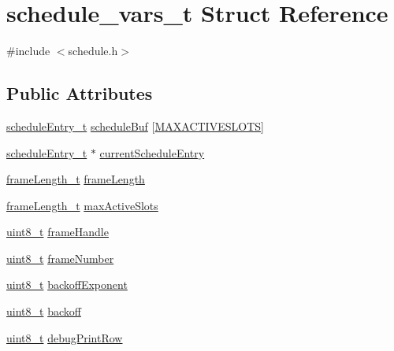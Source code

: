 \hypertarget{structschedule__vars__t}{}\section{schedule\+\_\+vars\+\_\+t Struct Reference}
\label{structschedule__vars__t}


{\ttfamily \#include $<$schedule.\+h$>$}

\subsection*{Public Attributes}
\begin{DoxyCompactItemize}
\item 
\hyperlink{structschedule_entry__t}{schedule\+Entry\+\_\+t} \hyperlink{structschedule__vars__t_a05b00ed294afeac2f3e2525231039a5c}{schedule\+Buf} \mbox{[}\hyperlink{group___schedule_ga5b6f09fe180237288683a64602eb5a85}{M\+A\+X\+A\+C\+T\+I\+V\+E\+S\+L\+O\+TS}\mbox{]}
\item 
\hyperlink{structschedule_entry__t}{schedule\+Entry\+\_\+t} $\ast$ \hyperlink{structschedule__vars__t_a8a63d21af04805a20c4361f58b809d51}{current\+Schedule\+Entry}
\item 
\hyperlink{group___schedule_gab960413860c0b01b38ece025b0ee534d}{frame\+Length\+\_\+t} \hyperlink{structschedule__vars__t_a6414f530ffa703355f89868cc4bcc711}{frame\+Length}
\item 
\hyperlink{group___schedule_gab960413860c0b01b38ece025b0ee534d}{frame\+Length\+\_\+t} \hyperlink{structschedule__vars__t_ab93c6951abd5fd6fecabe15b5faf7644}{max\+Active\+Slots}
\item 
\hyperlink{_p_e___types_8h_aba7bc1797add20fe3efdf37ced1182c5}{uint8\+\_\+t} \hyperlink{structschedule__vars__t_a2d897e0a8ee6c61193f2567ad80116a9}{frame\+Handle}
\item 
\hyperlink{_p_e___types_8h_aba7bc1797add20fe3efdf37ced1182c5}{uint8\+\_\+t} \hyperlink{structschedule__vars__t_a411d136c167ac38a1b275a04f635f346}{frame\+Number}
\item 
\hyperlink{_p_e___types_8h_aba7bc1797add20fe3efdf37ced1182c5}{uint8\+\_\+t} \hyperlink{structschedule__vars__t_aaef939536fcb09d07535d0209a512fad}{backoff\+Exponent}
\item 
\hyperlink{_p_e___types_8h_aba7bc1797add20fe3efdf37ced1182c5}{uint8\+\_\+t} \hyperlink{structschedule__vars__t_aef135d552e6640d22fdc5315c9c17983}{backoff}
\item 
\hyperlink{_p_e___types_8h_aba7bc1797add20fe3efdf37ced1182c5}{uint8\+\_\+t} \hyperlink{structschedule__vars__t_a6826ab0c8f46dbdf97a135c5475f5285}{debug\+Print\+Row}
\end{DoxyCompactItemize}


